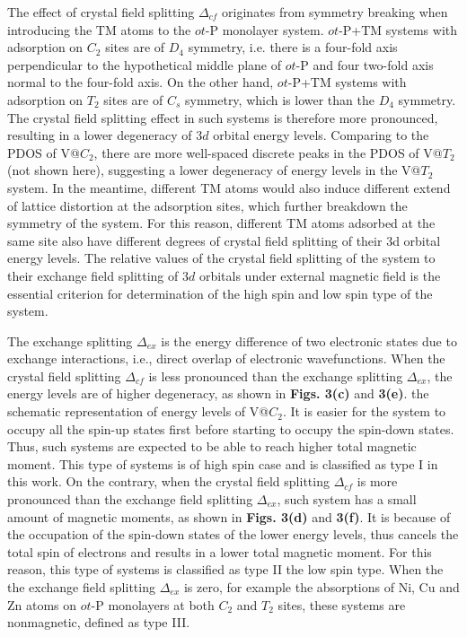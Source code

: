 \documentclass[%
superscriptaddress,
preprint,
showpacs,preprintnumbers,
 amsmath,amssymb,
prb,
]{revtex4-1}
\begin{document}
The effect of crystal field splitting $\Delta_{cf}$ originates from
symmetry breaking when introducing the TM atoms to the $ot$-P monolayer
system. $ot$-P+TM systems with adsorption on $C_{2}$ sites are of $D_{4}$
symmetry, i.e. there is a four-fold axis perpendicular to the hypothetical
middle plane of $ot$-P and four two-fold axis normal to the four-fold
axis. On the other hand, $ot$-P+TM systems with adsorption on $T_{2}$
sites are of $C_{s}$ symmetry, which is lower than the $D_{4}$ symmetry. The crystal
field splitting effect in such systems is therefore more pronounced,
resulting in a lower degeneracy of 3$d$ orbital energy levels. Comparing to the PDOS
of V@$C_{2}$, there are more well-spaced discrete peaks
in the PDOS of V@$T_{2}$(not shown here), suggesting a lower degeneracy
of energy levels in the V@$T_{2}$ system. In the meantime, different TM atoms would also induce different extend of lattice distortion at the adsorption sites, which further breakdown
the symmetry of the system. For this reason, different TM atoms adsorbed
at the same site also have different degrees of crystal field splitting
of their 3d orbital energy levels. The relative values of the crystal
field splitting of the system to their exchange field splitting of
3$d$ orbitals under external magnetic field is the essential criterion
for determination of the high spin and low spin type of the system.

The exchange splitting $\Delta_{ex}$ is the energy difference of two electronic states due to exchange interactions, i.e., direct overlap of electronic wavefunctions. When the crystal field splitting $\Delta_{cf}$ is less pronounced than the exchange splitting $\Delta_{ex}$, the energy levels are
of higher degeneracy, as shown in \textbf{Figs. 3(c) }and \textbf{3(e)}.
the schematic representation of energy levels of V@$C_{2}$.
It is easier for the system to occupy all the spin-up states first
before starting to occupy the spin-down states. Thus, such systems
are expected to be able to reach higher total magnetic moment. This type of systems is of high
spin case and is classified as type I in this work. On the contrary,
when the crystal field splitting $\Delta_{cf}$ is more pronounced
than the exchange field splitting $\Delta_{ex}$, such system has a small amount of magnetic moments, as
shown in \textbf{Figs. 3(d) }and \textbf{3(f)}. It is because of the occupation of the spin-down states of the lower energy levels, thus cancels the total spin of electrons and results in a
lower total magnetic moment. For this reason, this type of systems
is classified as type II \textendash{} the low spin type. When the the exchange field splitting $\Delta_{ex}$ is zero, for example the absorptions of Ni, Cu and Zn atoms on $ot$-P monolayers at both $C_2$ and $T_2$ sites, these systems are nonmagnetic, defined as type III.
\end{document}
